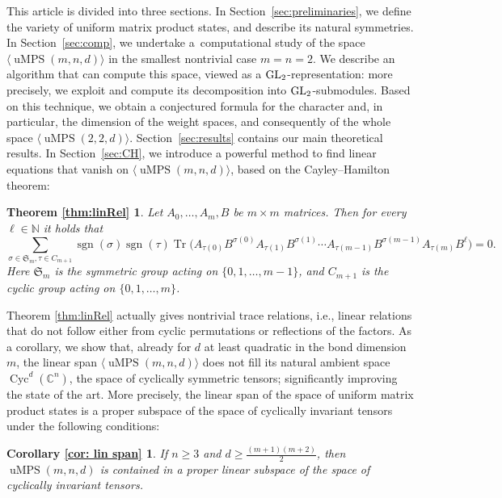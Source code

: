 \documentclass[10pt,a4paper]{amsart}
\numberwithin{equation}{section}
\DeclareMathOperator{\Tr}{Tr}
\DeclareMathOperator{\sgn}{sgn}
\newcommand{\CC}{\mathbb{C}}
\DeclareMathOperator{\uMPS}{uMPS}
\DeclareMathOperator{\Cyc}{Cyc}
\begin{document}
This article is divided into three sections. In Section~\ref{sec:preliminaries}, we define the variety of uniform matrix product states, and describe its natural symmetries.
In Section~\ref{sec:comp}, we undertake a~computational study of the space $\langle\uMPS(m,n,d)\rangle$ in the smallest nontrivial case ${m=n=2}$. We describe an algorithm that can compute this space, viewed as a ${\rm GL}_2$-representation: more precisely, we exploit and compute its decomposition into ${\rm GL}_2$-submodules. Based on this technique, we obtain a conjectured formula for the character and, in particular, the dimension of the weight spaces, and consequently of the whole space $\langle\uMPS(2,2,d)\rangle$.
Section~\ref{sec:results} contains our main theoretical results.
In Section~\ref{sec:CH}, we introduce a powerful method to find linear equations that vanish on $\langle\uMPS(m,n,d)\rangle$, based on the Cayley--Hamilton theorem:
	\theoremstyle{plain}
	\newtheorem*{thm:linRel}{Theorem \ref{thm:linRel}}
	\begin{thm:linRel}
		Let $A_0,\dots,A_m,B$ be $m \times m$ matrices. Then for every $\ell \in {\mathbb N}$ it holds that
		\begin{equation*}
			\sum_{\sigma \in \mathfrak{S}_m, \tau \in C_{m+1}} \sgn(\sigma)\sgn(\tau)\Tr\big(A_{\tau(0)}B^{\sigma(0)}A_{\tau(1)}B^{\sigma(1)} \cdots A_{\tau(m-1)}B^{\sigma(m-1)}A_{\tau(m)}B^{\ell}\big) =0.
		\end{equation*}
		Here $\mathfrak{S}_m$ is the symmetric group acting on $\{0,1,\dots,m-1\}$, and $C_{m+1}$ is the cyclic group acting on $\{0,1,\dots,m\}$.
	\end{thm:linRel}
	Theorem \ref{thm:linRel} actually gives nontrivial trace relations, i.e., linear relations that do not follow either from cyclic permutations or reflections of the factors.
	As a corollary, we show that, already for $d$ at least quadratic in the bond dimension $m$, the linear span $\langle\uMPS(m,n,d)\rangle$ does not fill its natural ambient space $\Cyc^d(\CC^n)$, the space of cyclically symmetric tensors; significantly improving the state of the art.
	More precisely, the linear span of the space of uniform matrix product states is a proper subspace of the space of cyclically invariant tensors %
	under the following conditions: %
	\theoremstyle{plain}
	\newtheorem*{cor: lin span}{Corollary \ref{cor: lin span}}
	\begin{cor: lin span}
		If $n \geq 3$ and $d \geq \frac{(m+1)(m+2)}{2}$, then ${\uMPS(m,n,d)}$ is contained in a proper linear subspace of the space of cyclically invariant tensors.
	\end{cor: lin span}
\end{document}
